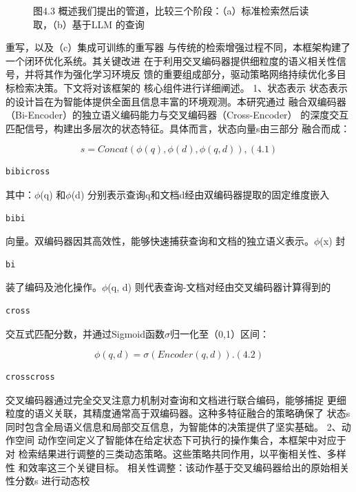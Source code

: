 \documentclass[12pt,a4paper,openright,UTF8]{ctexbook}
\begin{document}
\begin{figure}[htbp]
\centering
{}
\caption{图4.3 概述我们提出的管道，比较三个阶段：（a）标准检索然后读取，（b）基于LLM 的查询}
\end{figure}

重写，以及（c）集成可训练的重写器 与传统的检索增强过程不同，本框架构建了一个闭环优化系统。其关键改进 在于利用交叉编码器提供细粒度的语义相关性信号，并将其作为强化学习环境反 馈的重要组成部分，驱动策略网络持续优化多目标检索决策。下文将对该框架的 核心组件进行详细阐述。 1、状态表示 状态表示的设计旨在为智能体提供全面且信息丰富的环境观测。本研究通过 融合双编码器（Bi-Encoder）的独立语义编码能力与交叉编码器（Cross-Encoder） 的深度交互匹配信号，构建出多层次的状态特征。具体而言，状态向量s由三部分 融合而成：

\begin{equation*}
s= Concat (\phi(q), \phi(d), \phi(q, d)) ,(4.1)
\end{equation*}

\begin{lstlisting}
bibicross
\end{lstlisting}
其中：$\phi$(q) 和$\phi$(d) 分别表示查询q和文档d经由双编码器提取的固定维度嵌入

\begin{lstlisting}
bibi
\end{lstlisting}
向量。双编码器因其高效性，能够快速捕获查询和文档的独立语义表示。$\phi$(x) 封

\begin{lstlisting}
bi
\end{lstlisting}
装了编码及池化操作。$\phi$(q, d) 则代表查询-文档对经由交叉编码器计算得到的

\begin{lstlisting}
cross
\end{lstlisting}
交互式匹配分数，并通过Sigmoid函数$\sigma$归一化至（0,1）区间：

\begin{equation*}
\phi(q, d) = \sigma(Encoder(q, d)) .(4.2)
\end{equation*}

\begin{lstlisting}
crosscross
\end{lstlisting}
交叉编码器通过完全交叉注意力机制对查询和文档进行联合编码，能够捕捉 更细粒度的语义关联，其精度通常高于双编码器。这种多特征融合的策略确保了 状态s同时包含全局语义信息和局部交互信息，为智能体的决策提供了坚实基础。 2、动作空间 动作空间定义了智能体在给定状态下可执行的操作集合，本框架中对应于对 检索结果进行调整的三类动态策略。这些策略共同作用，以平衡相关性、多样性 和效率这三个关键目标。 相关性调整：该动作基于交叉编码器给出的原始相关性分数s 进行动态校
\end{document}
